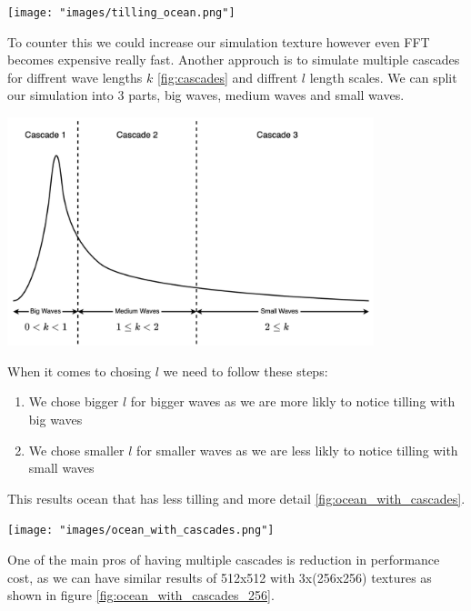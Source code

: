 \begin{minipage}{1\textwidth}
    \centering
    \texttt{[image: "images/tilling\_ocean.png"]}
    \label{fig:ocean_with_tilling}
\end{minipage}

To counter this we could increase our simulation texture however even FFT becomes expensive really fast.
Another approuch is to simulate multiple cascades for diffrent wave lengths $k$ \ref{fig:cascades} and diffrent $l$ length scales. We can split our simulation into 3 parts, big waves, medium waves and small waves.

\begin{minipage}{1\textwidth}
    \centering
    \includegraphics[width=0.8\textwidth]{"images/cascades.png"}
    \label{fig:cascades}
\end{minipage}

When it comes to chosing $l$ we need to follow these steps:
\begin{enumerate}
    \item We chose bigger $l$ for bigger waves as we are more likly to notice tilling with big waves
    \item We chose smaller $l$ for smaller waves as we are less likly to notice tilling with small waves
\end{enumerate}
This results ocean that has less tilling and more detail \ref{fig:ocean_with_cascades}.

\begin{minipage}{1\textwidth}
    \centering
    \texttt{[image: "images/ocean\_with\_cascades.png"]}
    \label{fig:ocean_with_cascades}
\end{minipage}

One of the main pros of having multiple cascades is reduction in performance cost, as we can have similar results of 512x512 with 3x(256x256) textures as shown in figure \ref{fig:ocean_with_cascades_256}.

